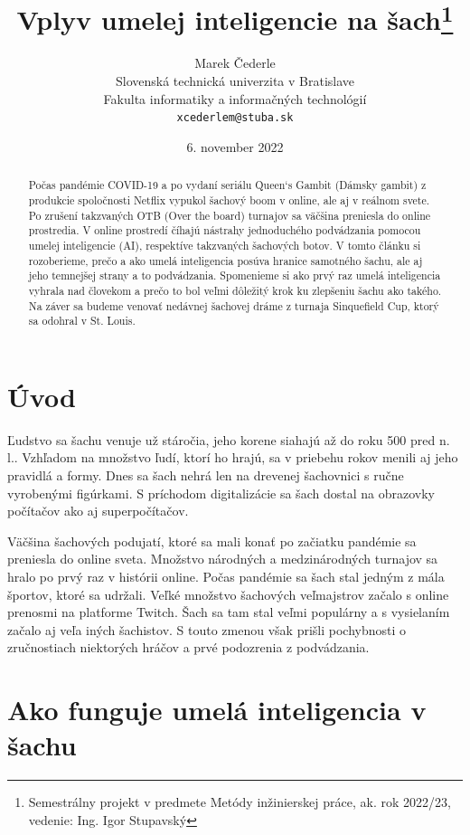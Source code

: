 \documentclass[10pt,oneside,slovak,a4paper]{article}
\title{Vplyv umelej inteligencie na šach\thanks{Semestrálny projekt v predmete Metódy inžinierskej práce, ak. rok 2022/23, vedenie: Ing. Igor Stupavský }}
\author{Marek Čederle\\[2pt]
	{\small Slovenská technická univerzita v Bratislave}\\
	{\small Fakulta informatiky a informačných technológií}\\
	{\small \texttt{xcederlem@stuba.sk}}
	}
\date{\small 6. november 2022}
\begin{document}
\maketitle

\vspace*{\fill}

\begin{abstract}
 Počas pandémie COVID-19 a po vydaní seriálu Queen‘s Gambit (Dámsky gambit) z produkcie spoločnosti Netflix vypukol šachový boom v online, ale aj v reálnom svete. Po zrušení takzvaných OTB (Over the board) turnajov sa väčšina preniesla do online prostredia. V online prostredí číhajú nástrahy jednoduchého podvádzania pomocou umelej inteligencie (AI), respektíve takzvaných šachových botov. V tomto článku si rozoberieme, prečo a ako umelá inteligencia posúva hranice samotného šachu, ale aj jeho temnejšej strany a to podvádzania. Spomenieme si ako prvý raz umelá inteligencia vyhrala nad človekom a prečo to bol veľmi dôležitý krok ku zlepšeniu šachu ako takého. Na záver sa budeme venovať nedávnej šachovej dráme z turnaja Sinquefield Cup, ktorý sa odohral v St. Louis.
\end{abstract}

\vspace*{\fill}
\pagebreak


\section{Úvod}

Ľudstvo sa šachu venuje už stáročia, jeho korene siahajú až do roku 500 pred n. l.. Vzhľadom na množstvo ľudí, ktorí ho hrajú, sa v priebehu rokov menili aj jeho pravidlá a formy. Dnes sa šach nehrá len na drevenej šachovnici s ručne vyrobenými figúrkami. S príchodom digitalizácie sa šach dostal na  obrazovky počítačov ako aj superpočítačov.

Väčšina šachových podujatí, ktoré sa mali konať po začiatku pandémie sa preniesla do online sveta. Množstvo národných a medzinárodných turnajov sa hralo po prvý raz v histórii online. Počas pandémie sa šach stal jedným z mála športov, ktoré sa udržali. Veľké množstvo šachových veľmajstrov začalo s online prenosmi na platforme Twitch. Šach sa tam stal veľmi populárny a s vysielaním začalo aj veľa iných šachistov. S touto zmenou však  prišli pochybnosti o zručnostiach niektorých hráčov a prvé podozrenia z podvádzania.



\section{Ako funguje umelá inteligencia v šachu}
\end{document}
